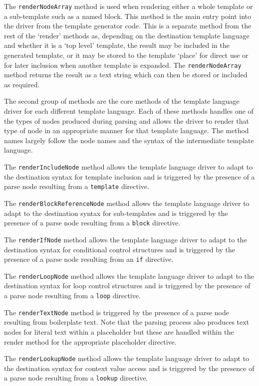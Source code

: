 The \verb!renderNodeArray! method is used when rendering either a whole template or a sub-template such as a named block. This method is the main entry point into the driver from the template generator code. This is a separate method from the rest of the `render' methods as, depending on the destination template language and whether it is a `top level' template, the result may be included in the generated template, or it may be stored to the template `place' for direct use or for later inclusion when another template is expanded. The \verb!renderNodeArray! method returns the result as a text string which can then be stored or included as required.

The second group of methods are the core methods of the template language driver for each different template language. Each of these methods handles one of the types of nodes produced during parsing and allows the driver to render that type of node in an appropriate manner for that template language. The method names largely follow the node names and the syntax of the intermediate template language.

The \verb!renderIncludeNode! method allows the template language driver to adapt to the destination syntax for template inclusion and is triggered by the presence of a parse node resulting from a \verb!template! directive.

The \verb!renderBlockReferenceNode! method allows the template language driver to adapt to the destination syntax for sub-templates and is triggered by the presence of a parse node resulting from a \verb!block! directive.

The \verb!renderIfNode! method allows the template language driver to adapt to the destination syntax for conditional control structures and is triggered by the presence of a parse node resulting from an \verb!if! directive.

The \verb!renderLoopNode! method allows the template language driver to adapt to the destination syntax for loop control structures and is triggered by the presence of a parse node resulting from a \verb!loop! directive.

The \verb!renderTextNode! method is triggered by the presence of a parse node resulting from boilerplate text. Note that the parsing process also produces text nodes for literal text within a placeholder but these are handled within the render method for the appropriate placeholder directive.

The \verb!renderLookupNode! method allows the template language driver to adapt to the destination syntax for context value access and is triggered by the presence of a parse node resulting from a \verb!lookup! directive.

